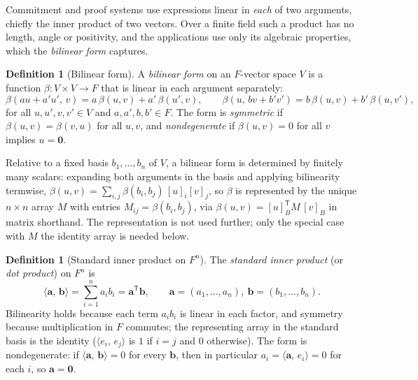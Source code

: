\documentclass[11pt,a4paper]{article}
\theoremstyle{definition}
\newtheorem{definition}[theorem]{Definition}
\theoremstyle{remark}
\newcommand{\ip}[2]{\langle #1,\, #2 \rangle}
\begin{document}
Commitment and proof systems use expressions linear in \emph{each} of two
arguments, chiefly the inner product of two vectors. Over a finite field
such a product has no length, angle or positivity, and the applications
use only its algebraic properties, which the \emph{bilinear form}
captures.

\begin{definition}[Bilinear form]\label{linalg:def-bilinear}
A \emph{bilinear form} on an \(F\)-vector space \(V\) is a function
\(\beta \colon V \times V \to F\) that is linear in each argument
separately:
\[
\beta(au + a'u',\, v) = a\,\beta(u, v) + a'\,\beta(u', v),
\qquad
\beta(u,\, bv + b'v') = b\,\beta(u, v) + b'\,\beta(u, v'),
\]
for all \(u, u', v, v' \in V\) and \(a, a', b, b' \in F\). The form is
\emph{symmetric} if \(\beta(u, v) = \beta(v, u)\) for all \(u, v\), and
\emph{nondegenerate} if \(\beta(u, v) = 0\) for all \(v\) implies
\(u = \mathbf 0\).
\end{definition}

Relative to a fixed basis \(b_1, \dots, b_n\) of \(V\), a bilinear form
is determined by finitely many scalars: expanding both arguments in the
basis and applying bilinearity termwise,
\(\beta(u, v) = \sum_{i,j} \beta(b_i, b_j)\, [u]_i [v]_j\), so \(\beta\)
is represented by the unique \(n \times n\) array
\(M\) with entries \(M_{ij} = \beta(b_i, b_j)\), via
\(\beta(u, v) = [u]_B^{\mathsf T} M\, [v]_B\) in matrix shorthand. The
representation is not used further; only the special case with \(M\) the
identity array is needed below.

\begin{definition}[Standard inner product on
\texorpdfstring{\(F^n\)}{F\^{}n}]\label{linalg:def-stdip}
The \emph{standard inner product} (or \emph{dot product}) on \(F^n\) is
\[
\ip{\mathbf a}{\mathbf b} = \sum_{i=1}^{n} a_i b_i
= \mathbf a^{\mathsf T} \mathbf b,
\qquad
\mathbf a = (a_1, \dots, a_n), \ \mathbf b = (b_1, \dots, b_n).
\]
Bilinearity holds because each term \(a_i b_i\) is linear in each
factor, and symmetry because multiplication in \(F\) commutes; the
representing array in the standard basis is the identity
(\(\ip{e_i}{e_j}\) is \(1\) if \(i = j\) and \(0\) otherwise). The form
is nondegenerate: if \(\ip{\mathbf a}{\mathbf b} = 0\) for every
\(\mathbf b\), then in particular
\(a_i = \ip{\mathbf a}{e_i} = 0\) for each \(i\), so
\(\mathbf a = \mathbf 0\).
\end{definition}
\end{document}
